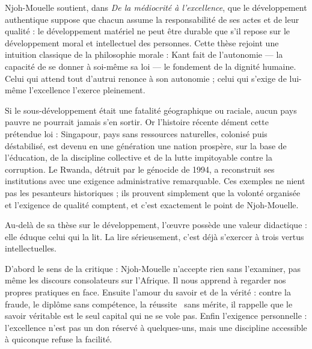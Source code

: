 \documentclass[11pt]{article}
\newcommand{\cle}[1]{{\popxbold\color{popdark}#1}}
\newcounter{popsec}
\newcounter{popsub}
\newcommand{\courssub}[1]{%
  \stepcounter{popsub}%
  \par\vspace{9pt}\noindent{\popxbold\fontsize{11.5}{13}\selectfont\color{popink}{\color{poporange}\thepopsec.\thepopsub}\hspace{6pt}#1}\par\nopagebreak\vspace{4pt}
}
\begin{document}
\begin{propriete}
Njoh-Mouelle soutient, dans \emph{De la médiocrité à l'excellence}, que le développement authentique suppose que chacun assume la responsabilité de ses actes et de leur qualité : le développement matériel ne peut être durable que s'il repose sur le développement moral et intellectuel des personnes. Cette thèse rejoint une intuition classique de la philosophie morale : Kant fait de l'autonomie — la capacité de se donner à soi-même sa loi — le fondement de la dignité humaine. Celui qui attend tout d'autrui renonce à son autonomie ; celui qui s'exige de lui-même l'excellence l'exerce pleinement.
\end{propriete}

\begin{exemplebox}
Si le sous-développement était une fatalité géographique ou raciale, aucun pays pauvre ne pourrait jamais s'en sortir. Or l'histoire récente dément cette prétendue loi : Singapour, pays sans ressources naturelles, colonisé puis déstabilisé, est devenu en une génération une nation prospère, sur la base de l'éducation, de la discipline collective et de la lutte impitoyable contre la corruption. Le Rwanda, détruit par le génocide de 1994, a reconstruit ses institutions avec une exigence administrative remarquable. Ces exemples ne nient pas les pesanteurs historiques ; ils prouvent simplement que la volonté organisée et l'exigence de qualité comptent, et c'est exactement le point de Njoh-Mouelle.
\end{exemplebox}

\courssub{La valeur didactique : une école de vertu}

Au-delà de sa thèse sur le développement, l'œuvre possède une \cle{valeur didactique} : elle éduque celui qui la lit. La lire sérieusement, c'est déjà s'exercer à trois vertus intellectuelles.

D'abord le \cle{sens de la critique} : Njoh-Mouelle n'accepte rien sans l'examiner, pas même les discours consolateurs sur l'Afrique. Il nous apprend à regarder nos propres pratiques en face. Ensuite l'\cle{amour du savoir et de la vérité} : contre la fraude, le diplôme sans compétence, la \guillemotleft réussite \guillemotright\ sans mérite, il rappelle que le savoir véritable est le seul capital qui ne se vole pas. Enfin l'\cle{exigence personnelle} : l'excellence n'est pas un don réservé à quelques-uns, mais une discipline accessible à quiconque refuse la facilité.
\end{document}
